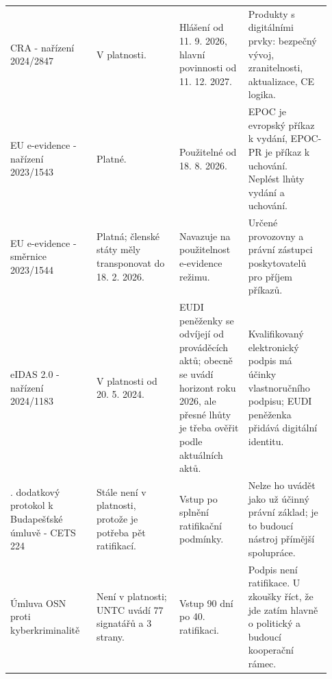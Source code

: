 \begin{longtable}{p{0.25\linewidth}p{0.24\linewidth}p{0.20\linewidth}p{0.24\linewidth}}
\addlinespace
CRA - nařízení 2024/2847 & V platnosti. & Hlášení od 11. 9. 2026, hlavní povinnosti od 11. 12. 2027. & Produkty s digitálními prvky: bezpečný vývoj, zranitelnosti, aktualizace, CE logika.\\
\addlinespace
EU e-evidence - nařízení 2023/1543 & Platné. & Použitelné od 18. 8. 2026. & EPOC je evropský příkaz k vydání, EPOC-PR je příkaz k uchování. Neplést lhůty vydání a uchování.\\
\addlinespace
EU e-evidence - směrnice 2023/1544 & Platná; členské státy měly transponovat do 18. 2. 2026. & Navazuje na použitelnost e-evidence režimu. & Určené provozovny a právní zástupci poskytovatelů pro příjem příkazů.\\
\addlinespace
eIDAS 2.0 - nařízení 2024/1183 & V platnosti od 20. 5. 2024. & EUDI peněženky se odvíjejí od prováděcích aktů; obecně se uvádí horizont roku 2026, ale přesné lhůty je třeba ověřit podle aktuálních aktů. & Kvalifikovaný elektronický podpis má účinky vlastnoručního podpisu; EUDI peněženka přidává digitální identitu.\\
\addlinespace
2. dodatkový protokol k Budapešťské úmluvě - CETS 224 & Stále není v platnosti, protože je potřeba pět ratifikací. & Vstup po splnění ratifikační podmínky. & Nelze ho uvádět jako už účinný právní základ; je to budoucí nástroj přímější spolupráce.\\
\addlinespace
Úmluva OSN proti kyberkriminalitě & Není v platnosti; UNTC uvádí 77 signatářů a 3 strany. & Vstup 90 dní po 40. ratifikaci. & Podpis není ratifikace. U zkoušky říct, že jde zatím hlavně o politický a budoucí kooperační rámec.\\
\bottomrule
\end{longtable}

\newpage


